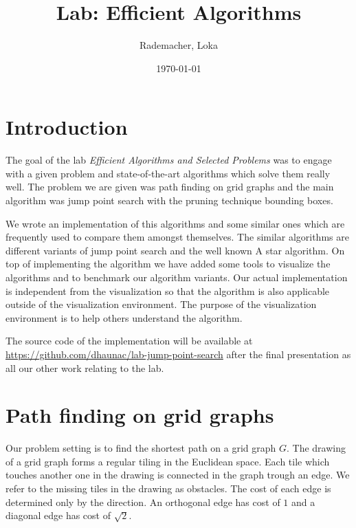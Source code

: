 \documentclass{article}
\begin{document}
    \title{Lab: Efficient Algorithms}
    \author{Rademacher, Loka}
    \date{\today}

    \thispagestyle{empty}
    \begin{center}
        \noindent
        \makebox[0pt][r]{\thedate}


        \noindent
        \centerline{\huge \sc \thetitle}

        \vspace*{-2pt}

        \noindent
        \centerline{\large {\theauthor}}
    \end{center}



    \section{Introduction}

    The goal of the lab \textit{Efficient Algorithms and Selected Problems} was to engage with a given problem and state-of-the-art algorithms which solve them really well. The problem we are given was path finding on grid graphs and the main algorithm was jump point search with the pruning technique bounding boxes.

    We wrote an implementation of this algorithms and some similar ones which are frequently used to compare them amongst themselves. The similar algorithms are different variants of jump point search and the well known A star algorithm. On top of implementing the algorithm we have added some tools to visualize the algorithms and to benchmark our algorithm variants. Our actual implementation is independent from the visualization so that the algorithm is also applicable outside of the visualization environment. The purpose of the visualization environment is to help others understand the algorithm.

    The source code of the implementation will be available at \url{https://github.com/dhaunac/lab-jump-point-search} after the final presentation as all our other work relating to the lab.



    \section{Path finding on grid graphs}

    Our problem setting is to find the shortest path on a grid graph $G$. The drawing of a grid graph forms a regular tiling in the Euclidean space. Each tile which touches another one in the drawing is connected in the graph trough an edge. We refer to the missing tiles in the drawing as obstacles. The cost of each edge is determined only by the direction. An orthogonal edge has cost of $1$ and a diagonal edge has cost of $\sqrt{2}$.
\end{document}
